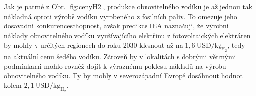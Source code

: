 Jak je patrné z Obr. \ref{fig:cenyH2}, produkce obnovitelného vodíku je až jednou tak nákladná oproti výrobě vodíku vyrobeného z fosilních paliv. To omezuje jeho dosavadní konkurenceschopnost, avšak predikce \acs{IEA} naznačují, že výrobní náklady obnovitelného vodíku využívajícího elektřinu z fotovoltaických elektráren by mohly v určitých regionech do roku 2030 klesnout až na $1,6\ \mathrm{USD/kg_{H_2}}$, tedy na aktuální cenu šedého vodíku. Zároveň by v lokalitách s dobrými větrnými podmínkami mohlo rovněž dojít k výraznému poklesu nákladů na výrobu obnovitelného vodíku. Ty by mohly v severozápadní Evropě dosáhnout hodnot kolem $2,1\ \mathrm{USD/kg_{H_2}}$. \cite{IEAreview}